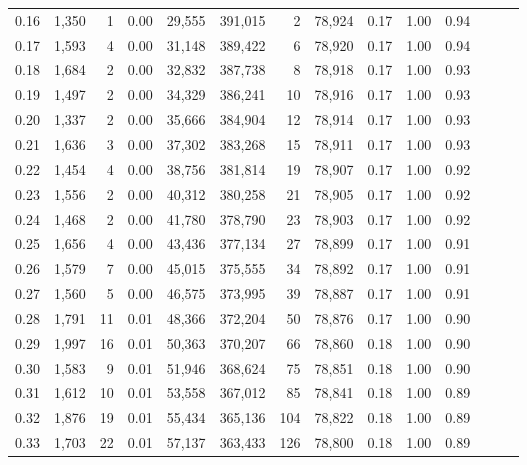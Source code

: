 \begin{tabular}{rrrrrrrrrrrrrr}
0.16 &   1,350 &      1 &  0.00 &   29,555 &  391,015 &       2 &  78,924 &  0.17 &  1.00 &      0.94 \\
0.17 &   1,593 &      4 &  0.00 &   31,148 &  389,422 &       6 &  78,920 &  0.17 &  1.00 &      0.94 \\
0.18 &   1,684 &      2 &  0.00 &   32,832 &  387,738 &       8 &  78,918 &  0.17 &  1.00 &      0.93 \\
0.19 &   1,497 &      2 &  0.00 &   34,329 &  386,241 &      10 &  78,916 &  0.17 &  1.00 &      0.93 \\
0.20 &   1,337 &      2 &  0.00 &   35,666 &  384,904 &      12 &  78,914 &  0.17 &  1.00 &      0.93 \\
0.21 &   1,636 &      3 &  0.00 &   37,302 &  383,268 &      15 &  78,911 &  0.17 &  1.00 &      0.93 \\
0.22 &   1,454 &      4 &  0.00 &   38,756 &  381,814 &      19 &  78,907 &  0.17 &  1.00 &      0.92 \\
0.23 &   1,556 &      2 &  0.00 &   40,312 &  380,258 &      21 &  78,905 &  0.17 &  1.00 &      0.92 \\
0.24 &   1,468 &      2 &  0.00 &   41,780 &  378,790 &      23 &  78,903 &  0.17 &  1.00 &      0.92 \\
0.25 &   1,656 &      4 &  0.00 &   43,436 &  377,134 &      27 &  78,899 &  0.17 &  1.00 &      0.91 \\
0.26 &   1,579 &      7 &  0.00 &   45,015 &  375,555 &      34 &  78,892 &  0.17 &  1.00 &      0.91 \\
0.27 &   1,560 &      5 &  0.00 &   46,575 &  373,995 &      39 &  78,887 &  0.17 &  1.00 &      0.91 \\
0.28 &   1,791 &     11 &  0.01 &   48,366 &  372,204 &      50 &  78,876 &  0.17 &  1.00 &      0.90 \\
0.29 &   1,997 &     16 &  0.01 &   50,363 &  370,207 &      66 &  78,860 &  0.18 &  1.00 &      0.90 \\
0.30 &   1,583 &      9 &  0.01 &   51,946 &  368,624 &      75 &  78,851 &  0.18 &  1.00 &      0.90 \\
0.31 &   1,612 &     10 &  0.01 &   53,558 &  367,012 &      85 &  78,841 &  0.18 &  1.00 &      0.89 \\
0.32 &   1,876 &     19 &  0.01 &   55,434 &  365,136 &     104 &  78,822 &  0.18 &  1.00 &      0.89 \\
0.33 &   1,703 &     22 &  0.01 &   57,137 &  363,433 &     126 &  78,800 &  0.18 &  1.00 &      0.89 \\

\end{tabular}
